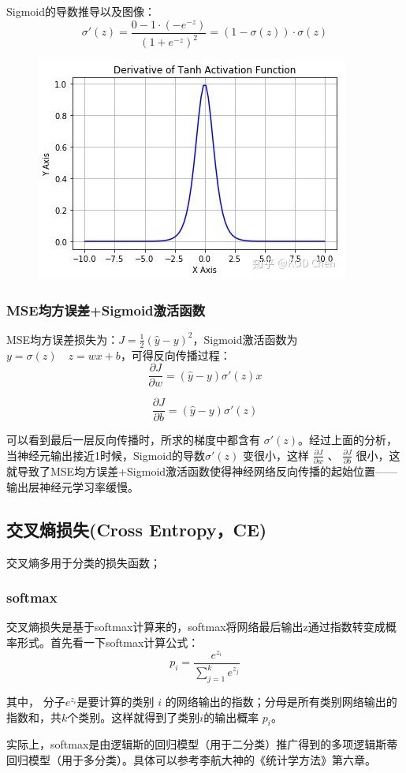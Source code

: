 \documentclass[12pt]{article}
\begin{document}
Sigmoid的导数推导以及图像：
$$
\sigma'(z) = \frac{0 - 1\cdot(-e^{-z})}{(1+e^{-z})^2} = (1-\sigma(z))\cdot\sigma(z)
$$
\begin{figure}[H]
  \centering
  \includegraphics[width=.5\textwidth]{fig/sigmoid_derievative_illustration.jpg} 
\end{figure}

\subsubsection{MSE均方误差+Sigmoid激活函数}
MSE均方误差损失为：$J = \frac{1}{2}(\hat y - y)^2$，Sigmoid激活函数为 $y = \sigma(z) \quad z = wx + b$，可得反向传播过程：
$$
\frac{\partial J}{\partial w} = (\hat y - y)\sigma'(z)x
$$

$$
\frac{\partial J}{\partial b} = (\hat y - y)\sigma'(z)
$$

可以看到最后一层反向传播时，所求的梯度中都含有 $\sigma'(z)$。经过上面的分析，当神经元输出接近1时候，Sigmoid的导数$\sigma'(z)$ 变很小，这样 $\frac{\partial J}{\partial w}$ 、 $\frac{\partial J}{\partial b}$ 很小，这就导致了MSE均方误差+Sigmoid激活函数使得神经网络反向传播的起始位置——输出层神经元学习率缓慢。

\subsection{交叉熵损失(Cross Entropy，CE)\cite{Commonly_Loss_Functions}}
交叉熵多用于分类的损失函数；

\subsubsection{softmax}
交叉熵损失是基于softmax计算来的，softmax将网络最后输出z通过指数转变成概率形式。首先看一下softmax计算公式：
$$
p_i = \frac{e^{z_i}}{\sum_{j=1}^ke^{z_j}}
$$

其中， 分子$e^{z_i}$是要计算的类别 $i$ 的网络输出的指数；分母是所有类别网络输出的指数和，共$k$个类别。这样就得到了类别$i$的输出概率 $p_i$。

实际上，softmax是由逻辑斯的回归模型（用于二分类）推广得到的多项逻辑斯蒂回归模型（用于多分类）。具体可以参考李航大神的《统计学方法》第六章。
\end{document}
